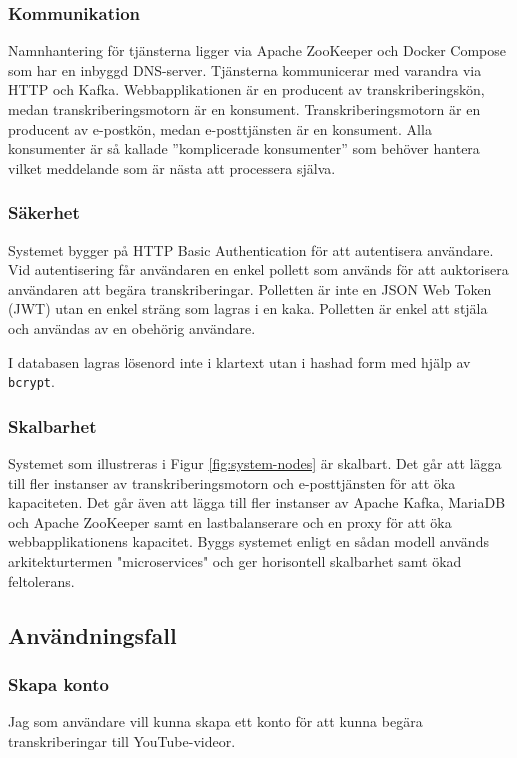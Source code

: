 \subsubsection{Kommunikation}
Namnhantering för tjänsterna ligger via Apache ZooKeeper och Docker Compose som har
en inbyggd DNS-server. Tjänsterna kommunicerar med varandra via HTTP och Kafka.
Webbapplikationen är en producent av transkriberingskön, medan transkriberingsmotorn är en
konsument. Transkriberingsmotorn är en producent av e-postkön, medan e-posttjänsten
är en konsument. Alla konsumenter är så kallade ''komplicerade konsumenter'' som
behöver hantera vilket meddelande som är nästa att processera själva.

\subsubsection{Säkerhet}
Systemet bygger på HTTP Basic Authentication för att autentisera användare. Vid
autentisering får användaren en enkel pollett som används för att auktorisera
användaren att begära transkriberingar. Polletten är inte en JSON Web Token
(JWT) utan en enkel sträng som lagras i en kaka. Polletten är enkel att stjäla
och användas av en obehörig användare. 

I databasen lagras lösenord inte i klartext utan i hashad form med hjälp av
\verb|bcrypt|. 

\subsubsection{Skalbarhet}
Systemet som illustreras i Figur \ref{fig:system-nodes} är skalbart. Det går
att lägga till fler instanser av transkriberingsmotorn och e-posttjänsten för
att öka kapaciteten. Det går även att lägga till fler instanser av Apache Kafka,
MariaDB och Apache ZooKeeper samt en lastbalanserare och en proxy för att öka
webbapplikationens kapacitet. Byggs systemet enligt en sådan modell används
arkitekturtermen "microservices" och ger horisontell skalbarhet samt ökad
feltolerans. 

\subsection{Användningsfall}

\subsubsection{Skapa konto}
Jag som användare vill kunna skapa ett konto för att kunna begära
transkriberingar till YouTube-videor.

